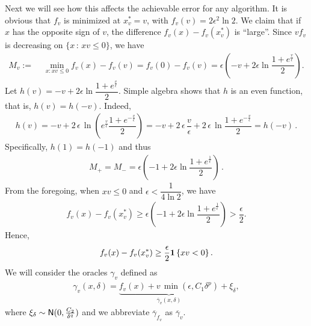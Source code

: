 Next we will see how this affects the achievable error for any algorithm. It is obvious that $f_v$ is minimized at $x^*_v = v$, with $f_v(v) = 2 \epsilon^2 \ln 2$.
We claim that if $x$ has the opposite sign of $v$, the difference $f_v(x)-f_v(x_v^*)$ is ``large''.
Since $v f_v$ is decreasing on $\{x\,:\, xv \le 0\}$, we have
\begin{align*}
M_v :=&\,\, \min_{x:xv \le 0} f_v(x) - f_v(v) 
=   f_v(0) - f_v(v)  
=  \epsilon\left(-v + 2\epsilon\ln\dfrac{1+e^{\frac{v}{\epsilon}}}{2}\right). \nonumber %
\end{align*}
Let $h(v) = -v + 2\epsilon\ln\dfrac{1+e^{\frac{v}{\epsilon}}}{2}$.
Simple algebra shows that $h$ is an even function, that is, $h(v) = h(-v)$. Indeed,
\begin{align*}
h(v) = -v + 2\,\epsilon\,\ln\left(e^{\frac{v}{\epsilon}} \dfrac{1+e^{-\frac{v}{\epsilon}}}{2}\right)
= -v + 2\,\epsilon\, \dfrac{v}{\epsilon}  + 2\,\epsilon\,\ln\dfrac{1+e^{-\frac{v}{\epsilon}}}{2}
=  h(-v)\,.
\end{align*}
Specifically, $h(1) = h(-1)$ and thus
\begin{align*}
M_+= M_- = \epsilon\left(-1 + 2\epsilon\ln\dfrac{1+e^{\frac{1}{\epsilon}}}{2}\right)\,.
\end{align*}
From the foregoing, when $xv \le 0$ and $\epsilon<\dfrac{1}{4\ln 2}$,  we have
\begin{align*}
f_v(x)-f_v(x_v^*) \ge \epsilon\left( -1 +2\epsilon \ln\dfrac{1+e^{\frac{1}{\epsilon}}}{2}  \right)> \dfrac{\epsilon}{2}.
\end{align*}
Hence,
\begin{align}
  f_v(x) - f_v(x^*_v)
  \ge \dfrac{\epsilon}{2}  \mathbf{1}\left\{x v  < 0\right\}. \label{eq:fv-lb}
\end{align}
We will consider the oracles $\gamma_v$ defined as 
\begin{align}
 \gamma_v(x,\delta)
 	 = 
	 \underbrace{
	 f_v(x)
 	+ v\, \min(\epsilon,C_1 \delta^p)}_{\overline{\gamma}_v(x,\delta)} + \xi_\delta, \label{eq:main:oracle-1d}
\end{align}
where $\xi_\delta \sim \mathsf{N}(0,\frac{C_2}{\delta^q})$
and we abbreviate $\overline{\gamma}_{f_v}$ as $\overline{\gamma}_v$.

